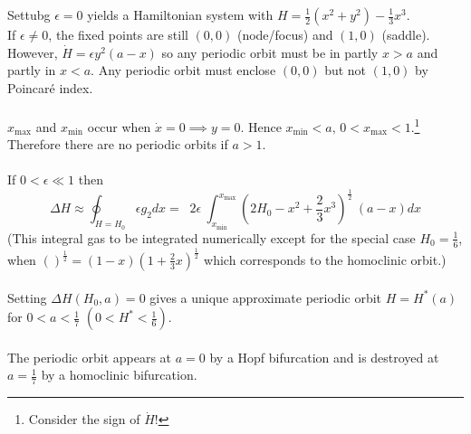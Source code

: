 \documentclass{article}
\begin{document}
Settubg $\epsilon =0$ yields a Hamiltonian system with 
$H= \frac{1}{2}(x^2+y^2) - \frac{1}{3}x^3$.
\\
If $\epsilon \neq 0$, the fixed points are still $(0,0)$ (node/focus) and $(1,0)$
(saddle). However, $\dot{H} = \epsilon y^2 (a-x)$ so any periodic orbit must be
in partly $x>a$ and partly in $x<a$. Any periodic orbit must enclose $(0,0)$
but not $(1,0)$ by Poincar\'e index.
\\
\\
$x_{\max}$ and $x_{\min}$ occur when $\dot{x}=0 \implies y=0$. Hence 
$x_{\min} < a, \, 0 < x_{\max} < 1$.\footnote{Consider the sign of $\dot{H}$!}
Therefore there are no periodic orbits if $a>1$.
\\
\\
If $0 < \epsilon \ll 1$ then 
\[ \Delta H \approx \oint_{H =H_0} \epsilon g_2 dx =\;\; 2 \epsilon\
\int_{x_{\min}}^{x_{\max}} (2H_0 - x^2 + \frac{2}{3} x^3)^{\frac{1}{2}} \
(a-x) dx \]
(This integral gas to be integrated numerically except for the special case
$H_0 = \frac{1}{6}$, when $()^{\frac{1}{2}} = (1-x)(1+\frac{2}{3} x)^{\frac{1}{2}}$
which corresponds to the homoclinic orbit.)
\\
\\
Setting $\Delta H(H_0,a) =0$ gives a unique approximate periodic orbit
$H = H^{*}(a)$ for $0<a<\frac{1}{7}$ $(0<H^{*}<\frac{1}{6})$.
\\
\\
The periodic orbit appears at $a=0$ by a Hopf bifurcation and is destroyed
at $a = \frac{1}{7}$ by a homoclinic bifurcation.
\\
\end{document}
